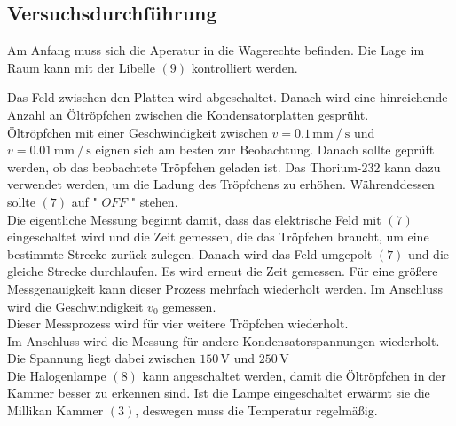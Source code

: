 \subsection{Versuchsdurchführung}
Am Anfang muss sich die Aperatur in die Wagerechte befinden. Die Lage im Raum kann mit der Libelle $(9)$ kontrolliert werden.

Das Feld zwischen den Platten wird abgeschaltet. Danach wird eine hinreichende Anzahl an Öltröpfchen zwischen die Kondensatorplatten gesprüht. \\

Öltröpfchen mit einer Geschwindigkeit zwischen $v = 0.1 \, \unit{\milli\meter} \mathbin{/} \unit{\second}$ und $v = 0.01 \, \unit{\milli\meter} \mathbin{/} \unit{\second}$ eignen sich am besten zur Beobachtung.
Danach sollte geprüft werden, ob das beobachtete Tröpfchen geladen ist. Das Thorium-232 kann dazu verwendet werden, um die Ladung des Tröpfchens zu erhöhen. Währenddessen sollte $(7)$ auf " $OFF$ "${}$ stehen. \\

Die eigentliche Messung beginnt damit, dass das elektrische Feld mit $(7)$ eingeschaltet wird und die Zeit gemessen, die das Tröpfchen braucht, um eine bestimmte Strecke zurück zulegen.
Danach wird das Feld umgepolt $ (7) $ und die gleiche Strecke durchlaufen. Es wird erneut die Zeit gemessen. Für eine größere Messgenauigkeit kann dieser Prozess mehrfach wiederholt werden.
Im Anschluss wird die Geschwindigkeit $v_0$ gemessen. \\

Dieser Messprozess wird für vier weitere Tröpfchen wiederholt.\\

Im Anschluss wird die Messung für andere Kondensatorspannungen wiederholt. Die Spannung liegt dabei zwischen $150 \, \unit{\volt}$ und $250 \, \unit{\volt}$\\

Die Halogenlampe $(8)$ kann angeschaltet werden, damit die Öltröpfchen in der Kammer besser zu erkennen sind.
Ist die Lampe eingeschaltet erwärmt sie die Millikan Kammer $(3)$, deswegen muss die Temperatur regelmäßig.
